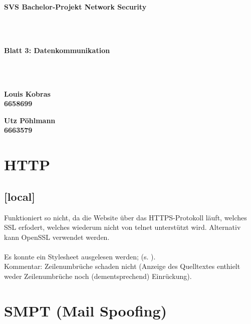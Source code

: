 \documentclass[twoside]{article}
\begin{document}
\pagestyle{fancy}
\fancyhead{}
\fancyfoot{}

\begin{center}
\begin{Huge}
\textbf{SVS Bachelor-Projekt Network Security}
\end{Huge}\\\-\\
\begin{Large}
\textbf{Blatt 3: Datenkommunikation}
\end{Large}\\\-\\
\begin{minipage}[t]{0.48\textwidth}
\begin{center}\textbf{
	Louis Kobras\\
	6658699}
\end{center}
\end{minipage}
\begin{minipage}[t]{0.48\textwidth}
\begin{center}\textbf{
	Utz Pöhlmann\\
	6663579}
\end{center}
\end{minipage}
\end{center}

\section{HTTP}
\subsection{[local]}
Funktioniert so nicht, da die Website über das HTTPS-Protokoll läuft, welches SSL erfodert, welches wiederum nicht von telnet unterstützt wird.
Alternativ kann OpenSSL verwendet werden.\\
\\
Es konnte ein Stylesheet ausgelesen werden; (s. \cite{svscss}).\\
Kommentar: Zeilenumbrüche schaden nicht (Anzeige des Quelltextes enthielt weder Zeilenumbrüche noch (dementsprechend) Einrückung).


\section{SMPT (Mail Spoofing)}
\end{document}
